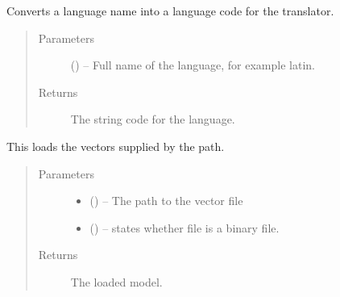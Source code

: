 \documentclass[letterpaper,10pt,english]{sphinxmanual}
\begin{document}
\begin{fulllineitems}
\label{\detokenize{code:hp_spells.langCode}}
Converts a language name into a language code for the translator.
\begin{quote}\begin{description}
\item[{Parameters}] \leavevmode
{} () -- Full name of the language, for example latin.

\item[{Returns}] \leavevmode
The string code for the language.

\end{description}\end{quote}

\end{fulllineitems}


\begin{fulllineitems}
\label{\detokenize{code:hp_spells.load_vectors}}
This loads the vectors supplied by the path.
\begin{quote}\begin{description}
\item[{Parameters}] \leavevmode\begin{itemize}
\item {} 
 () -- The path to the vector file

\item {} 
 () -- states whether file is a binary file.

\end{itemize}

\item[{Returns}] \leavevmode
The loaded model.

\end{description}\end{quote}

\end{fulllineitems}

\end{document}
